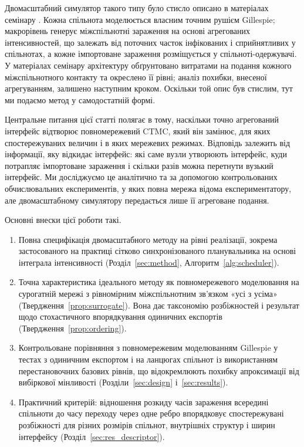 Двомасштабний симулятор такого типу було стисло описано в матеріалах семінару \citep{kuryliak2025towards}. Кожна спільнота моделюється власним точним рушієм Gillespie; макрорівень генерує міжспільнотні зараження на основі агрегованих інтенсивностей, що залежать від поточних часток інфікованих і сприйнятливих у спільнотах, а кожне імпортоване зараження розміщується у спільноті-одержувачі. У матеріалах семінару архітектуру обґрунтовано витратами на подання кожного міжспільнотного контакту та окреслено її рівні; аналіз похибки, внесеної агрегуванням, залишено наступним кроком. Оскільки той опис був стислим, тут ми подаємо метод у самодостатній формі.

Центральне питання цієї статті полягає в тому, наскільки точно агрегований інтерфейс відтворює повномережевий CTMC, який він замінює, для яких спостережуваних величин і в яких мережевих режимах. Відповідь залежить від інформації, яку відкидає інтерфейс: які саме вузли утворюють інтерфейс, куди потрапляє імпортоване зараження і скільки разів можна перетнути вузький інтерфейс. Ми досліджуємо це аналітично та за допомогою контрольованих обчислювальних експериментів, у яких повна мережа відома експериментатору, але двомасштабному симулятору передається лише її агреговане подання.

Основні внески цієї роботи такі.
\begin{enumerate}
\item Повна специфікація двомасштабного методу на рівні реалізації, зокрема застосованого на практиці сітково синхронізованого планувальника на основі інтеграла інтенсивності (Розділ~\ref{sec:method}, Алгоритм~\ref{alg:scheduler}).
\item Точна характеристика ідеального методу як повномережевого моделювання на сурогатній мережі з рівномірним міжспільнотним зв'язком «усі з усіма» (Твердження~\ref{prop:surrogate}). Вона дає таксономію розбіжностей і результат щодо стохастичного впорядкування одиничних експортів (Твердження~\ref{prop:ordering}).
\item Контрольоване порівняння з повномережевим моделюванням Gillespie у тестах з одиничним експортом і на ланцюгах спільнот із використанням перестановочних базових рівнів, що відокремлюють похибку апроксимації від вибіркової мінливості (Розділи~\ref{sec:design} і~\ref{sec:results}).
\item Практичний критерій: відношення розкиду часів зараження всередині спільноти до часу переходу через одне ребро впорядковує спостережувані розбіжності для різних розмірів спільнот, внутрішніх структур і ширин інтерфейсу (Розділ~\ref{sec:res_descriptor}).
\end{enumerate}

